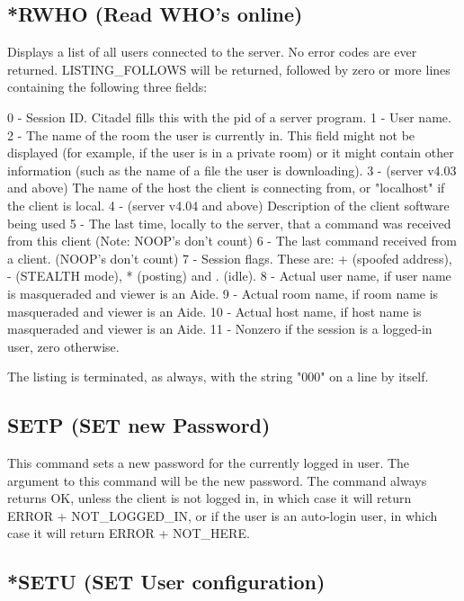 \subsection{*RWHO (Read WHO's online)}

 Displays a list of all users connected to the server.  No error codes are
ever returned.  LISTING_FOLLOWS will be returned, followed by zero or more
lines containing the following three fields:

 0 - Session ID.  Citadel fills this with the pid of a server program.
 1 - User name.
 2 - The name of the room the user is currently in.  This field might not
be displayed (for example, if the user is in a private room) or it might
contain other information (such as the name of a file the user is
downloading).
 3 - (server v4.03 and above) The name of the host the client is connecting
from, or "localhost" if the client is local.
 4 - (server v4.04 and above) Description of the client software being used
 5 - The last time, locally to the server, that a command was received from
     this client (Note: NOOP's don't count)
 6 - The last command received from a client. (NOOP's don't count)
 7 - Session flags.  These are: + (spoofed address), - (STEALTH mode), *
     (posting) and . (idle).
 8 - Actual user name, if user name is masqueraded and viewer is an Aide.
 9 - Actual room name, if room name is masqueraded and viewer is an Aide.
 10 - Actual host name, if host name is masqueraded and viewer is an Aide.
 11 - Nonzero if the session is a logged-in user, zero otherwise.

 The listing is terminated, as always, with the string "000" on a line by
itself.



\subsection{SETP (SET new Password)}

 This command sets a new password for the currently logged in user.  The
argument to this command will be the new password.  The command always
returns OK, unless the client is not logged in, in which case it will return
ERROR + NOT_LOGGED_IN, or if the user is an auto-login user, in which case
it will return ERROR + NOT_HERE.



\subsection{*SETU (SET User configuration)}

